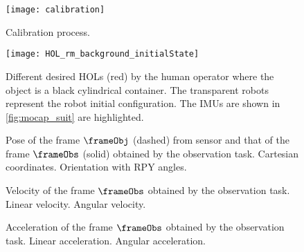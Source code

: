 	\begin{figure}
		\centering
		\texttt{[image: calibration]}
		\caption{Calibration process.}
		\label{fig:calibration}
	\end{figure}
\begin{figure}
	\centering
	\texttt{[image: HOL\_rm\_background\_initialState]}%
\caption{Different desired HOLs (red)  by the human operator where the object is a black cylindrical container. The transparent robots represent the robot initial configuration.  The IMUs are shown in \cref{fig:mocap_suit} are highlighted.}
\label{fig:HOL}
\end{figure}
\begin{figure}
\centering
{}
\caption{Pose of the frame $\frameObj$ (dashed) from sensor and that of the  frame  $\frameObs$ (solid) obtained by the observation task.  Cartesian coordinates.  Orientation with RPY angles.}
\label{fig:obsPose}
\end{figure}
\begin{figure}
\centering
{}
\caption{Velocity of the frame $\frameObs$  obtained by the observation task.  Linear velocity.  Angular velocity. }
\label{fig:obsVel}
\end{figure}
\begin{figure}
\centering
{}
\caption{Acceleration of the frame $\frameObs$  obtained by the observation task.  Linear acceleration.  Angular acceleration. }
\label{fig:obsAcc}
\end{figure}
